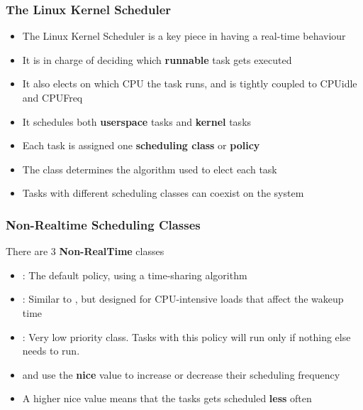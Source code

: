 \begin{frame}
	\frametitle{The Linux Kernel Scheduler}
	\begin{itemize}
		\item The Linux Kernel Scheduler is a key piece in having a real-time behaviour
		\item It is in charge of deciding which \textbf{runnable} task gets executed
		\item It also elects on which CPU the task runs, and is tightly coupled to CPUidle and CPUFreq
		\item It schedules both \textbf{userspace} tasks and \textbf{kernel} tasks
		\item Each task is assigned one \textbf{scheduling class} or \textbf{policy}
		\item The class determines the algorithm used to elect each task
		\item Tasks with different scheduling classes can coexist on the system
	\end{itemize}
\end{frame}

\begin{frame}
	\frametitle{Non-Realtime Scheduling Classes}
	There are 3 \textbf{Non-RealTime} classes
	\begin{itemize}
		\item {} : The default policy, using a time-sharing algorithm
		\item {} : Similar to , but designed for CPU-intensive loads that affect the wakeup time
		\item {} : Very low priority class. Tasks with this policy will run only if nothing else needs to run.
		\item {} and  use the \textbf{nice} value to increase or decrease their scheduling frequency
		\item A higher nice value means that the tasks gets scheduled \textbf{less} often
	\end{itemize}
\end{frame}


